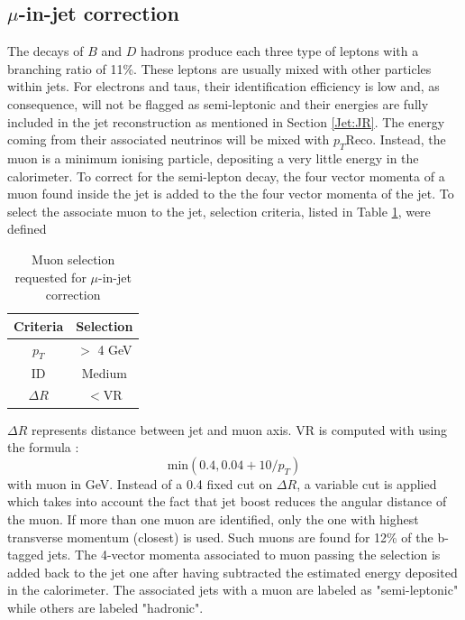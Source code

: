 \subsection{$\mu$-in-jet correction}
\label{Jet:Cal:BCal:MuInJet}
The decays of $B$ and $D$ hadrons produce each three type of leptons with a branching ratio of 11\%. These leptons are usually mixed with other particles within jets. For electrons and taus, their identification efficiency is low and, as consequence, will not be flagged as semi-leptonic and their energies are fully included in the jet reconstruction as mentioned in Section \ref{Jet:JR}. The energy coming from their associated neutrinos will be mixed with $p_T$Reco. Instead, the muon is a minimum ionising particle, depositing a very little energy in the calorimeter. To correct for the semi-lepton decay, the four vector momenta of a muon found inside the jet is added to the the four vector momenta of the jet. To select the associate muon to the jet, selection criteria, listed in Table \ref{tab:Jet:Cal:BCal:MuInJet:Sel}, were defined 
\begin{table}[htbp]
    \centering
    \begin{tabular}{cc}
       \hline\hline
        Criteria & Selection \\
        \hline
        $p_T$ & $>$ 4 GeV \\
         ID & Medium \\
         $\Delta R$ &  $<$VR\\
         \hline
         \hline
    \end{tabular}
    \caption{Muon selection requested for $\mu$-in-jet correction}
    \label{tab:Jet:Cal:BCal:MuInJet:Sel}
\end{table}
$\Delta R$ represents distance between jet and muon axis. VR is computed with using the formula :
\begin{equation}
    \mathrm{min}(0.4, 0.04+10/p_T)
\end{equation}
with muon \pT in GeV. Instead of a 0.4 fixed cut on $\Delta R$, a variable cut is applied which takes into account the fact that jet boost reduces the angular distance of the muon. If more than one muon are identified, only the one with highest transverse momentum (closest) is used. Such muons are found for 12\% of the b-tagged jets. The 4-vector momenta associated to muon passing the selection is added back to the jet one after having subtracted the estimated energy deposited in the calorimeter. The associated jets with a muon are labeled as "semi-leptonic" while others are labeled "hadronic".
